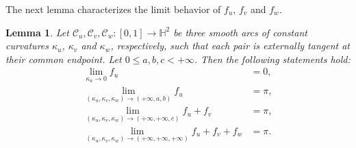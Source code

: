 \documentclass[11pt,leqno]{article}
\numberwithin{equation}{section}
\newtheorem{lemma}[theorem]{Lemma}
\theoremstyle{definition}
\begin{document}
The next lemma characterizes the limit behavior of $f_u$, $f_v$ and $f_w$.

\begin{lemma}
Let $\mathcal C_u,\mathcal C_v,\mathcal C_w: [0,1]\to\mathbb{H}^2$ be three smooth arcs of constant curvatures $\kappa_u$, $\kappa_v$ and $\kappa_w$, respectively, such that each pair is externally tangent at their common endpoint. Let $0\leq a,b,c<+\infty$. Then the following statements hold:
\begin{subequations}
\begin{align}
    \label{E-3-3a}\lim_{\kappa_u\to 0}f_u&=0,\\
\label{E-3-3b}\lim_{(\kappa_u,\kappa_v,\kappa_w)\to(+\infty,a,b)}f_u&=\pi,\\
\label{E-3-3c}\lim_{(\kappa_u,\kappa_v,\kappa_w)\to(+\infty,+\infty,c)}f_u+f_v&=\pi,\\
\label{E-3-3d}\lim_{(\kappa_u,\kappa_v,\kappa_w)\to(+\infty,+\infty,+\infty)}f_u+f_v+f_w&=\pi.
\end{align}\end{subequations}

\end{lemma}
\end{document}
